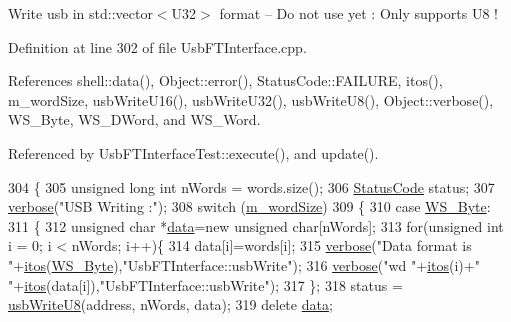Write usb in std\+::vector$<$\+U32$>$ format -- Do not use yet \+: Only supports U8 ! 

Definition at line 302 of file Usb\+F\+T\+Interface.\+cpp.



References shell\+::data(), Object\+::error(), Status\+Code\+::\+F\+A\+I\+L\+U\+RE, itos(), m\+\_\+word\+Size, usb\+Write\+U16(), usb\+Write\+U32(), usb\+Write\+U8(), Object\+::verbose(), W\+S\+\_\+\+Byte, W\+S\+\_\+\+D\+Word, and W\+S\+\_\+\+Word.



Referenced by Usb\+F\+T\+Interface\+Test\+::execute(), and update().


\begin{DoxyCode}
304 \{
305   \textcolor{keywordtype}{unsigned} \textcolor{keywordtype}{long} \textcolor{keywordtype}{int} nWords = words.size();
306   \hyperlink{classStatusCode}{StatusCode} status;
307   \hyperlink{classObject_a83d2db2df682907ea1115ad721c1c4a1}{verbose}(\textcolor{stringliteral}{"USB Writing :"});
308   \textcolor{keywordflow}{switch} (\hyperlink{classUsbFTInterface_a05ccc38a60c4b921b835238b604b38d8}{m\_wordSize})
309   \{
310   \textcolor{keywordflow}{case} \hyperlink{classUsbFTInterface_a057387f452eaac094fb77ba09cf1cf2ea32efe2feb6728578134aa9b85b97d1b9}{WS\_Byte}:
311     \{
312       \textcolor{keywordtype}{unsigned} \textcolor{keywordtype}{char} *\hyperlink{namespaceshell_a5ea2525995cedc3efd69ea8a7f034d1e}{data}=\textcolor{keyword}{new} \textcolor{keywordtype}{unsigned} \textcolor{keywordtype}{char}[nWords];
313       \textcolor{keywordflow}{for}(\textcolor{keywordtype}{unsigned} \textcolor{keywordtype}{int} i = 0; i < nWords; i++)\{
314         data[i]=words[i];
315         \hyperlink{classObject_a83d2db2df682907ea1115ad721c1c4a1}{verbose}(\textcolor{stringliteral}{"Data format is "}+\hyperlink{Tools_8h_af330027dbdafb9a30768b3613c553e60}{itos}(\hyperlink{classUsbFTInterface_a057387f452eaac094fb77ba09cf1cf2ea32efe2feb6728578134aa9b85b97d1b9}{WS\_Byte}),\textcolor{stringliteral}{"UsbFTInterface::usbWrite"});
316         \hyperlink{classObject_a83d2db2df682907ea1115ad721c1c4a1}{verbose}(\textcolor{stringliteral}{"wd "}+\hyperlink{Tools_8h_af330027dbdafb9a30768b3613c553e60}{itos}(i)+\textcolor{stringliteral}{" "}+\hyperlink{Tools_8h_af330027dbdafb9a30768b3613c553e60}{itos}(data[i]),\textcolor{stringliteral}{"UsbFTInterface::usbWrite"});
317       \};
318       status = \hyperlink{classUsbFTInterface_a8aeebce6a10aa88c19cfa663b47b389a}{usbWriteU8}(address, nWords, data);
319       \textcolor{keyword}{delete} \hyperlink{namespaceshell_a5ea2525995cedc3efd69ea8a7f034d1e}{data};

\end{DoxyCode}

